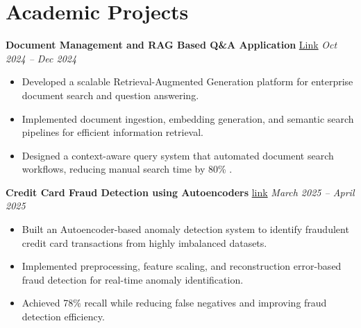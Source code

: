 \documentclass[a4paper,10pt]{article}
\begin{document}
\section*{Academic Projects}
\textbf{Document Management and RAG Based Q\&A Application}
\href{https://github.com/shubhamraj22/RAG-Based-QnA-System}{Link}
\hfill
\textit{Oct 2024 -- Dec 2024}
\begin{itemize}[leftmargin=1.5em, itemsep=0.01em]
  \item Developed a scalable Retrieval-Augmented Generation platform for enterprise document search and question answering. 
  \item Implemented document ingestion, embedding generation, and semantic search pipelines for efficient information retrieval. 
  \item Designed a context-aware query system that automated document search workflows, reducing manual search time by 80\% . 
\end{itemize}
\textbf{Credit Card Fraud Detection using Autoencoders}
\href{https://github.com/shubhamraj22/Credit-Card-Fraud-Detection-Using-Autoencoder/}{link}
\hfill 
\textit{March 2025 -- April 2025}
\begin{itemize}[leftmargin=1.5em, itemsep=0.01em]
  \item Built an Autoencoder-based anomaly detection system to identify fraudulent credit card transactions from highly imbalanced datasets. 
  \item Implemented preprocessing, feature scaling, and reconstruction error-based fraud detection for real-time anomaly identification. 
  \item Achieved 78\% recall while reducing false negatives and improving fraud detection efficiency. 
\end{itemize}
\end{document}
